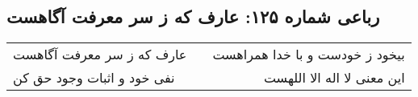 \begin{center}
\section*{رباعی شماره ۱۲۵: عارف که ز سر معرفت آگاهست}
\label{sec:sh125}
\begin{longtable}{l p{0.5cm} r}
عارف که ز سر معرفت آگاهست
&&
بیخود ز خودست و با خدا همراهست
\\
نفی خود و اثبات وجود حق کن
&&
این معنی لا اله الا اللهست
\\
\end{longtable}
\end{center}
